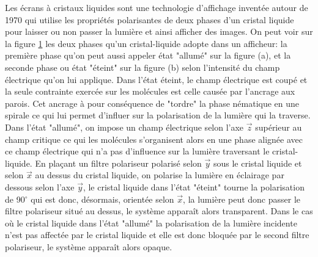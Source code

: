 \documentclass[11pt,a4paper]{article}
\numberwithin{equation}{section}
\begin{document}
Les écrans à cristaux liquides sont une technologie d'affichage inventée autour de 1970 qui utilise les propriétés polarisantes de deux phases d'un cristal liquide pour laisser ou non passer la lumière et ainsi afficher des images. On peut voir sur la figure \ref{freedericksz} les deux phases qu'un cristal-liquide adopte dans un afficheur: la première phase qu'on peut aussi appeler état "allumé" sur la figure (a), et la seconde phase ou état "éteint" sur la figure (b) selon l'intensité du champ électrique qu'on lui applique. Dans l'état éteint, le champ électrique est coupé et la seule contrainte exercée sur les molécules est celle causée par l'ancrage aux parois. Cet ancrage à pour conséquence de "tordre" la phase nématique en une spirale ce qui lui permet d'influer sur la polarisation de la lumière qui la traverse. Dans l'état "allumé", on impose un champ électrique selon l'axe $\vec{z}$ supérieur au champ critique ce qui les molécules s'organisent alors en une phase alignée avec ce champ électrique qui n'a pas d'influence sur la lumière traversant le cristal-liquide. En plaçant un filtre polariseur polarisé selon $\vec{y}$ sous le cristal liquide et selon $\vec{x}$ au dessus du cristal liquide, on polarise la lumière en éclairage par dessous selon l'axe $\vec{y}$, le cristal liquide dans l'état "éteint" tourne la polarisation de 90$^\circ$ qui est donc, désormais, orientée selon $\vec{x}$, la lumière peut donc passer le filtre polariseur situé au dessus, le système apparaît alors transparent. Dans le cas où le cristal liquide dans l'état "allumé" la polarisation de la lumière incidente n'est pas affectée par le cristal liquide et elle est donc bloquée par le second filtre polariseur, le système apparaît alors opaque.

\begin{figure}[h]
    \centering
\caption{}
    	\label{freedericksz} 
\end{figure}
\end{document}
